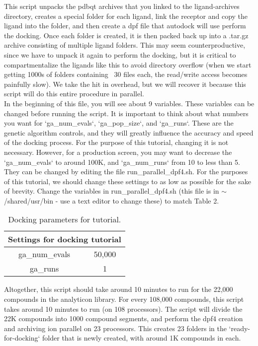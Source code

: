 This script unpacks the pdbqt archives that you linked to the ligand-archives directory, creates a special folder for each ligand, link the receptor and copy the ligand into the folder, and then create a dpf file that autodock will use perform the docking. Once each folder is created, it is then packed back up into a .tar.gz archive consisting of multiple ligand folders. This may seem counterproductive, since we have to unpack it again to perform the docking, but it is critical to compartmentalize the ligands like this to avoid directory overflow (when we start getting 1000s of folders containing ~30 files each, the read/write access becomes painfully slow). We take the hit in overhead, but we will recover it because this script will do this entire procedure in parallel. \\

In the beginning of this file, you will see about 9 variables. These variables can be changed before running the script. It is important to think about what numbers you want for `ga\_num\_evals`, `ga\_pop\_size`, and `ga\_runs`. These are the genetic algorithm controls, and they will greatly influence the accuracy and speed of the docking process. For the purpose of this tutorial, changing it is not necessary. However, for a production screen, you may want to decrease the `ga\_num\_evals` to around 100K, and `ga\_num\_runs` from 10 to less than 5. They can be changed by editing the file run\_parallel\_dpf4.sh. For the purposes of this tutorial, we should change these settings to as low as possible for the sake of brevity. Change the variables in run\_parallel\_dpf4.sh (this file is in $\sim$/shared/usr/bin - use a text editor to change these) to match Table 2. 

\begin{table}[h]
  \centering
  \begin{tabular}{|c|c|}
  \hline
  \multicolumn{2}{|c|}{Settings for docking tutorial} \\
  \hline
  ga\_num\_evals & 50,000 \\
  ga\_runs & 1 \\
  \hline
  \end{tabular}
\caption{Docking parameters for tutorial.}
\end{table}

Altogether, this script should take around 10 minutes to run for the 22,000 compounds in the analyticon library. For every 108,000 compounds, this script takes around 10 minutes to run (on 108 processors).  The script will divide the 22K compounds into 1000 compound segments, and perform the dpf4 creation and archiving ion parallel on 23 processors. This creates 23 folders in the `ready-for-docking` folder that is newly created, with around 1K compounds in each.

